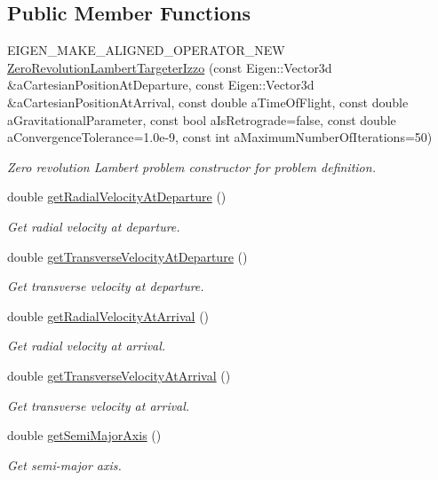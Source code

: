 \subsection*{Public Member Functions}
\begin{DoxyCompactItemize}
\item 
E\+I\+G\+E\+N\+\_\+\+M\+A\+K\+E\+\_\+\+A\+L\+I\+G\+N\+E\+D\+\_\+\+O\+P\+E\+R\+A\+T\+O\+R\+\_\+\+N\+EW \hyperlink{classtudat_1_1mission__segments_1_1ZeroRevolutionLambertTargeterIzzo_adc2e6f6b30f240915bb319903f68a587}{Zero\+Revolution\+Lambert\+Targeter\+Izzo} (const Eigen\+::\+Vector3d \&a\+Cartesian\+Position\+At\+Departure, const Eigen\+::\+Vector3d \&a\+Cartesian\+Position\+At\+Arrival, const double a\+Time\+Of\+Flight, const double a\+Gravitational\+Parameter, const bool a\+Is\+Retrograde=false, const double a\+Convergence\+Tolerance=1.\+0e-\/9, const int a\+Maximum\+Number\+Of\+Iterations=50)
\begin{DoxyCompactList}\small\item\em Zero revolution Lambert problem constructor for problem definition. \end{DoxyCompactList}\item 
double \hyperlink{classtudat_1_1mission__segments_1_1ZeroRevolutionLambertTargeterIzzo_aa4e2a96db3a43d9c7557c9246aeaadfb}{get\+Radial\+Velocity\+At\+Departure} ()
\begin{DoxyCompactList}\small\item\em Get radial velocity at departure. \end{DoxyCompactList}\item 
double \hyperlink{classtudat_1_1mission__segments_1_1ZeroRevolutionLambertTargeterIzzo_a1e2096c63935fbaf3496aebebb742419}{get\+Transverse\+Velocity\+At\+Departure} ()
\begin{DoxyCompactList}\small\item\em Get transverse velocity at departure. \end{DoxyCompactList}\item 
double \hyperlink{classtudat_1_1mission__segments_1_1ZeroRevolutionLambertTargeterIzzo_aee339aa28f3f7d0f9bc0c02e8155c9ec}{get\+Radial\+Velocity\+At\+Arrival} ()
\begin{DoxyCompactList}\small\item\em Get radial velocity at arrival. \end{DoxyCompactList}\item 
double \hyperlink{classtudat_1_1mission__segments_1_1ZeroRevolutionLambertTargeterIzzo_ab22c41bde66c025f1f5a3c7fbab46354}{get\+Transverse\+Velocity\+At\+Arrival} ()
\begin{DoxyCompactList}\small\item\em Get transverse velocity at arrival. \end{DoxyCompactList}\item 
double \hyperlink{classtudat_1_1mission__segments_1_1ZeroRevolutionLambertTargeterIzzo_a1979b80bd49c1656d738378f31195700}{get\+Semi\+Major\+Axis} ()
\begin{DoxyCompactList}\small\item\em Get semi-\/major axis. \end{DoxyCompactList}\end{DoxyCompactItemize}
